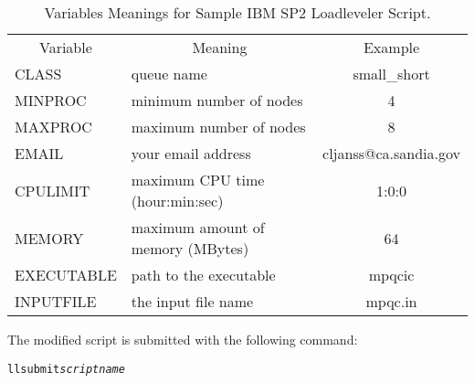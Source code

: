 \begin{table}
\caption{Variables Meanings for Sample IBM SP2 Loadleveler Script.}
\begin{center}
\begin{tabular}{lp{2.5in}c}
  \multicolumn{1}{c}{Variable}
     & \multicolumn{1}{c}{Meaning}
     & \multicolumn{1}{c}{Example} \\
  CLASS & queue name & small\_short \\
  MINPROC & minimum number of nodes & 4 \\
  MAXPROC & maximum number of nodes & 8 \\
  EMAIL & your email address & cljanss@ca.sandia.gov \\
  CPULIMIT & maximum CPU time (hour:min:sec) & 1:0:0 \\
  MEMORY & maximum amount of memory (MBytes) & 64 \\
  EXECUTABLE & path to the executable & mpqcic \\
  INPUTFILE & the input file name & mpqc.in \\
\end{tabular}
\end{center}
\label{running:spvariables}
\end{table}

The modified script is submitted with the following command:

\begin{alltt}
llsubmit {\itshape scriptname}
\end{alltt}

